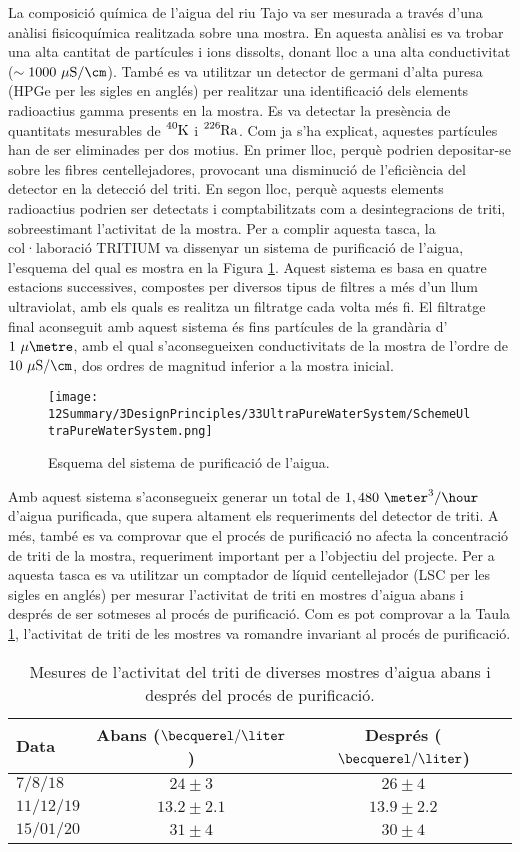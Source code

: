 La composició química de l'aigua del riu Tajo va ser mesurada a través d'una anàlisi fisicoquímica realitzada sobre una mostra. En aquesta anàlisi es va trobar una alta cantitat de partícules i ions dissolts, donant lloc a una alta conductivitat ($\sim 1000~\mu\text{S}/\cm$). També es va utilitzar un detector de germani d'alta puresa (HPGe per les sigles en anglés) per realitzar una identificació dels elements radioactius gamma presents en la mostra. Es va detectar la presència de quantitats mesurables de $\ce{^{40}K}$ i $\ce{^{226}Ra}$. Com ja s'ha explicat, aquestes partícules han de ser eliminades per dos motius. En primer lloc, perquè podrien depositar-se sobre les fibres centellejadores, provocant una disminució de l'eficiència del detector en la detecció del triti. En segon lloc, perquè aquests elements radioactius podrien ser detectats i comptabilitzats com a desintegracions de triti, sobreestimant l'activitat de la mostra. Per a complir aquesta tasca, la col·laboració TRITIUM va dissenyar un sistema de purificació de l'aigua, l'esquema del qual es mostra en la Figura \ref{fig:EsquemaSistemaAiguaUltrapura}. Aquest sistema es basa en quatre estacions successives, compostes per diversos tipus de filtres a més d'un llum ultraviolat, amb els quals es realitza un filtratge cada volta més fi. El filtratge final aconseguit amb aquest sistema és fins partícules de la grandària d'$1~\mu\metre$, amb el qual s'aconsegueixen conductivitats de la mostra de l'ordre de $10~\mu\text{S}/\cm$, dos ordres de magnitud inferior a la mostra inicial.
\begin{figure}[htbp]
\centering
\texttt{[image: 12Summary/3DesignPrinciples/33UltraPureWaterSystem/SchemeUltraPureWaterSystem.png]}
\caption{Esquema del sistema de purificació de l'aigua.\label{fig:EsquemaSistemaAiguaUltrapura}}
\end{figure}
Amb aquest sistema s'aconsegueix generar un total de $1,480~\meter^3/\hour$ d'aigua purificada, que supera altament els requeriments del detector de triti. A més, també es va comprovar que el procés de purificació no afecta la concentració de triti de la mostra, requeriment important per a l'objectiu del projecte. Per a aquesta tasca es va utilitzar un comptador de líquid centellejador (LSC per les sigles en anglés) per mesurar l'activitat de triti en mostres d'aigua abans i després de ser sotmeses al procés de purificació. Com es pot comprovar a la Taula \ref{tab:ValorsActivitatTriti}, l'activitat de triti de les mostres va romandre invariant al procés de purificació.

\begin{table}[htbp]
\centering{}%
\begin{tabular}{lcc}
\toprule 
Data & Abans ($\becquerel/\liter$) & Després ($\becquerel/\liter$) \tabularnewline
\midrule
\midrule 
$7/8/18$ & $24 \pm 3$ & $26 \pm 4$ \tabularnewline
$11/12/19$ & $13.2 \pm 2.1$ & $13.9 \pm 2.2$ \tabularnewline
$15/01/20$ & $31 \pm 4$ & $30 \pm 4$ \tabularnewline
\bottomrule
\end{tabular}
\caption{Mesures de l'activitat del triti de diverses mostres d'aigua abans i després del procés de purificació.}
\label{tab:ValorsActivitatTriti}
\end{table}

